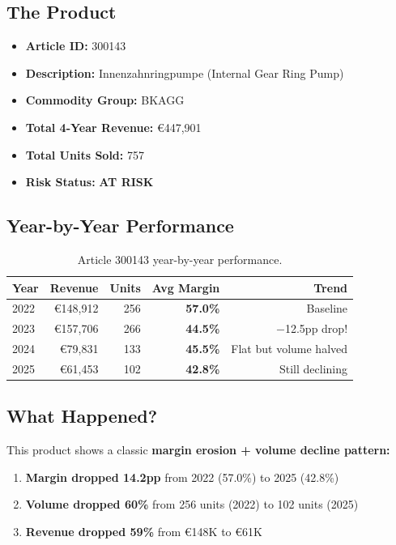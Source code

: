 \documentclass[11pt,a4paper]{article}
\newcommand{\EUR}{\euro{}}
\newcommand{\pp}{pp}
\begin{document}
\subsection{The Product}

\begin{itemize}[nosep]
  \item \textbf{Article ID:} 300143
  \item \textbf{Description:} Innenzahnringpumpe (Internal Gear Ring Pump)
  \item \textbf{Commodity Group:} BKAGG
  \item \textbf{Total 4-Year Revenue:} \EUR447{,}901
  \item \textbf{Total Units Sold:} 757
  \item \textbf{Risk Status:} \textbf{AT RISK}
\end{itemize}

\subsection{Year-by-Year Performance}

\begin{table}[H]
\centering
\begin{tabular}{lrrrr}
\toprule
\textbf{Year} & \textbf{Revenue} & \textbf{Units} & \textbf{Avg Margin} & \textbf{Trend} \\
\midrule
2022 & \EUR148{,}912 & 256 & \textbf{57.0\%} & Baseline \\
2023 & \EUR157{,}706 & 266 & \textbf{44.5\%} & $-$12.5\pp{} drop! \\
2024 & \EUR79{,}831  & 133 & \textbf{45.5\%} & Flat but volume halved \\
2025 & \EUR61{,}453  & 102 & \textbf{42.8\%} & Still declining \\
\bottomrule
\end{tabular}
\caption{Article 300143 year-by-year performance.}
\end{table}

\subsection{What Happened?}

This product shows a classic \textbf{margin erosion + volume decline pattern:}
\begin{enumerate}[nosep]
  \item \textbf{Margin dropped 14.2\pp{}} from 2022 (57.0\%) to 2025 (42.8\%)
  \item \textbf{Volume dropped 60\%} from 256 units (2022) to 102 units (2025)
  \item \textbf{Revenue dropped 59\%} from \EUR148K to \EUR61K
\end{enumerate}
\end{document}
